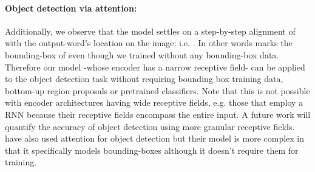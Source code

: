 \documentclass{article}
\begin{document}
\paragraph{Object detection via attention:}
Additionally, we observe that the model settles on a step-by-step alignment of  with the output-word's location on the image: i.e. . In other words  marks the bounding-box of  even though we trained without any bounding-box data. Therefore our model -whose encoder has a narrow receptive field- can be applied to the object detection task without requiring bounding box training data, bottom-up region proposals or pretrained classifiers. Note that this is not possible with encoder architectures having wide receptive fields, e.g. those that employ a RNN \cite{Deng2017ImagetoMarkupGW, Bahdanau2014NeuralMT} because their receptive fields encompass the entire input. A future work will quantify the accuracy of object detection \cite{Liu2017AttentionCI} using more granular receptive fields. \citet{DBLP:journals/corr/PedersoliLSV16} have also used attention for object detection but their model is more complex in that it specifically models bounding-boxes although it doesn't require them for training.
\end{document}
